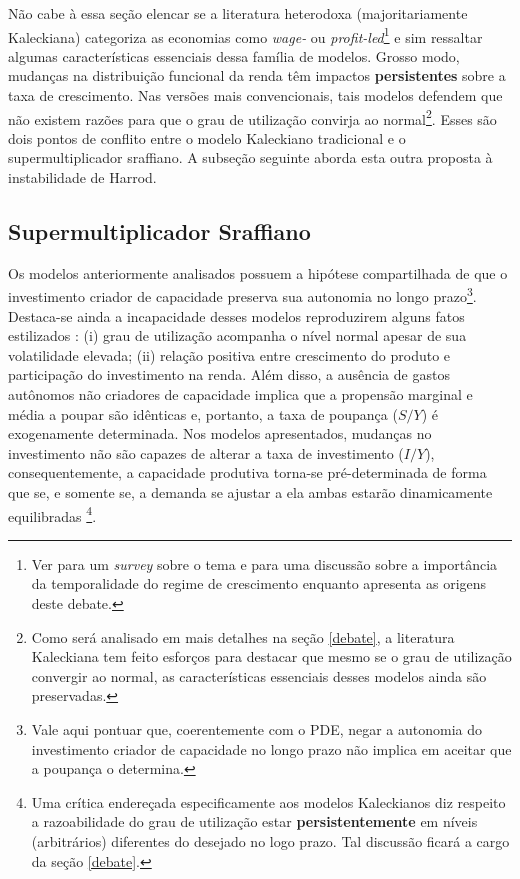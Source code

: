 Não cabe à essa seção elencar se a literatura heterodoxa (majoritariamente Kaleckiana) categoriza as economias como \textit{wage-} ou \textit{profit-led}\footnote{Ver \textcites{blecker_distribution_2002}{onaran_is_2013} para um  \textit{survey} sobre o tema e \textcite{blecker_wage-led_2016} para uma discussão sobre a importância da temporalidade do regime de crescimento enquanto \textcite{lavoie_origins_2017} apresenta as origens deste debate.} e sim ressaltar algumas  características essenciais dessa família de modelos. Grosso modo, mudanças na distribuição funcional da renda têm impactos \textbf{persistentes} sobre a taxa de crescimento. Nas versões mais convencionais, tais modelos defendem que não existem razões para que o grau de utilização convirja ao normal\footnote{Como será analisado em mais detalhes na seção \ref{debate}, a literatura Kaleckiana tem feito esforços para destacar que mesmo se o grau de utilização convergir ao normal, as características essenciais desses modelos ainda são preservadas.}. Esses são dois pontos de conflito entre o modelo Kaleckiano tradicional e o supermultiplicador sraffiano. A subseção seguinte aborda esta outra proposta à instabilidade de Harrod.

\subsection{Supermultiplicador Sraffiano}

Os modelos anteriormente analisados possuem a hipótese compartilhada de que o investimento criador de capacidade preserva sua autonomia no longo prazo\footnote{Vale aqui pontuar que, coerentemente com o PDE, negar a autonomia do investimento criador de capacidade no longo prazo não implica em aceitar que a poupança o determina.}.  Destaca-se ainda a incapacidade desses modelos reproduzirem alguns fatos estilizados \cite[p.~5]{fagundes_role_2017}: (i) grau de utilização acompanha o nível normal apesar de sua volatilidade elevada; (ii) relação positiva entre crescimento do produto e participação do investimento na renda.  Além disso, a ausência de gastos autônomos não criadores de capacidade implica que a propensão marginal e média a poupar são idênticas e, portanto, a taxa de poupança ($S/Y$) é exogenamente determinada. Nos modelos apresentados, mudanças no investimento não são capazes de alterar a taxa de investimento ($I/Y$), consequentemente, a capacidade produtiva torna-se pré-determinada de forma que se, e somente se, a demanda se ajustar a ela ambas estarão dinamicamente equilibradas \cite[p.~84 REVER PÁGINA]{serrano_sraffian_2017}\footnote{Uma crítica endereçada especificamente aos modelos Kaleckianos diz respeito a razoabilidade do grau de utilização estar \textbf{persistentemente} em níveis (arbitrários) diferentes do desejado no logo prazo. Tal discussão ficará a cargo da seção \ref{debate}.}.


